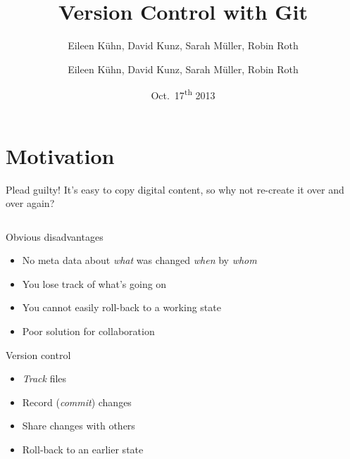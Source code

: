 \documentclass[18pt,mathserif]{beamer}
\title{Version Control with Git}
\author{Eileen K\"uhn, David Kunz, Sarah M\"uller, Robin Roth}
\subtitle{Eileen K\"uhn, David Kunz, Sarah M\"uller, Robin Roth}
\institute{KSETA Doktorandenworkshop, 22.07.2014}
\date{Oct.~17\textsuperscript{th} 2013}
\begin{document}
\maketitle

\section{Motivation}

\begin{frame}{Plead guilty!}
  It's easy to copy digital content, so why not re-create it over and over
  again?

  \begin{columns}[onlytextwidth]

  \end{columns}
\end{frame}
\begin{frame}{Obvious disadvantages}
  \begin{itemize}
    \item No meta data about \emph{what} was changed \emph{when} by
      \emph{whom}
    \item You lose track of what's going on
    \item You cannot easily roll-back to a working state
    \item Poor solution for collaboration
  \end{itemize}
\end{frame}
\begin{frame}{Version control}
	\begin{itemize}
		\item \emph{Track} files
		\item Record (\emph{commit}) changes
		\item Share changes with others
		\item Roll-back to an earlier state
	\end{itemize}
\end{frame}
\end{document}
